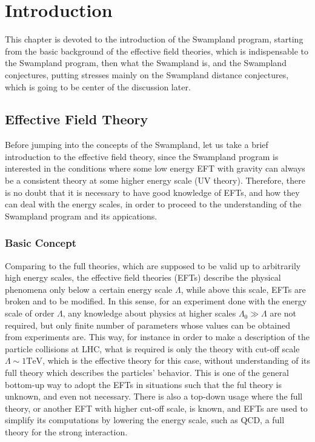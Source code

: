 \chapter{Introduction}
\label{Chapter1}
This chapter is devoted to the introduction of the Swampland program, starting from the basic background of the effective field theories, which is indispensable to the Swampland program, then what the Swampland is, and the Swampland conjectures, putting stresses mainly on the Swampland distance conjectures, which is going to be center of the discussion later. 
\section{Effective Field Theory}
Before jumping into the concepts of the Swampland, let us take a brief introduction to the effective field theory, since the Swampland program is interested in the conditions where some low energy EFT with gravity can always be a consistent theory at some higher energy scale (UV theory). Therefore, there is no doubt that it is necessary to have good knowledge of EFTs, and how they can deal with the energy scales, in order to proceed to the understanding of the Swampland program and its appications.    
\subsection{Basic Concept}
Comparing to the full theories, which are supposed to be valid up to arbitrarily high energy scales, the effective field theories (EFTs) describe the physical phenomena only below a certain energy scale $\Lambda$, while above this scale, EFTs are broken and to be modified. In this sense, for an experiment done with the energy scale of order $\Lambda$, any knowledge about physics at higher scales $\Lambda _{0} \gg \Lambda$ are not required, but only finite number of parameters whose values can be obtained from experiments are. This way, for instance in order to make a description of the particle collisions at LHC, what is required is only the theory with cut-off scale $\Lambda \sim 1\text{TeV}$, which is the effective theory for this case, without understanding of its full theory which describes the particles' behavior. This is one of the general bottom-up way to adopt the EFTs in situations such that the ful theory is unknown, and even not necessary. There is also a top-down usage where the full theory, or another EFT with higher cut-off scale, is known, and EFTs are used to simplify its computations by lowering the energy scale, such as QCD, a full theory for the strong interaction.  

